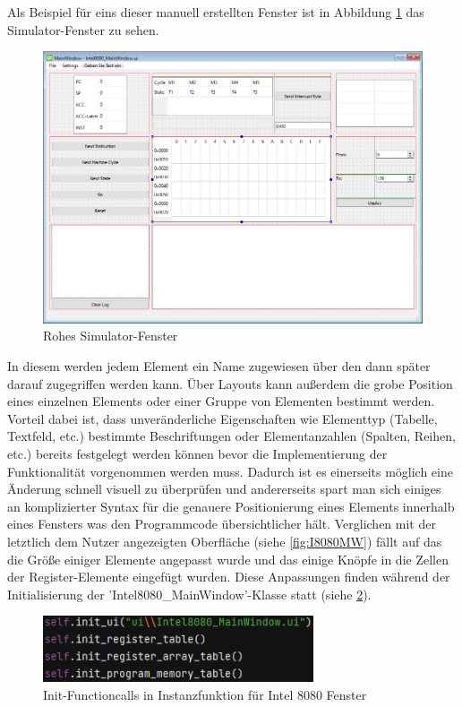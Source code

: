 \documentclass[12pt]{article}
\newcommand{\imgSpaceBefore}{\vspace{10pt}}
\begin{document}
\noindent
Als Beispiel für eins dieser manuell erstellten Fenster ist in Abbildung \ref{fig:RawUI} das Simulator-Fenster zu sehen.\imgSpaceBefore

\begin{figure}[H]
\centering
\includegraphics[width=15cm]{bilder/RawUIFile}
\caption{Rohes Simulator-Fenster}
\label{fig:RawUI}
\end{figure}

\noindent
In diesem werden jedem Element ein Name zugewiesen über den dann später darauf zugegriffen werden kann. Über Layouts kann außerdem die grobe Position eines einzelnen Elements oder einer Gruppe von Elementen bestimmt werden. Vorteil dabei ist, dass unveränderliche Eigenschaften wie Elementtyp (Tabelle, Textfeld, etc.) bestimmte Beschriftungen oder Elementanzahlen (Spalten, Reihen, etc.) bereits festgelegt werden können bevor die Implementierung der Funktionalität vorgenommen werden muss. Dadurch ist es einerseits möglich eine Änderung schnell visuell zu überprüfen und andererseits spart man sich einiges an komplizierter Syntax für die genauere Positionierung eines Elements innerhalb eines Fensters was den Programmcode übersichtlicher hält. Verglichen mit der letztlich dem Nutzer angezeigten Oberfläche (siehe \ref{fig:I8080MW}) fällt auf das die Größe einiger Elemente angepasst wurde und das einige Knöpfe in die Zellen der Register-Elemente eingefügt wurden. Diese Anpassungen finden während der Initialisierung der 'Intel8080\_MainWindow'-Klasse statt (siehe \ref{fig:InitFuncs}).\imgSpaceBefore

\begin{figure}[H]
\centering
\includegraphics[width=8cm]{bilder/initFuncs}
\caption{Init-Functioncalls in Instanzfunktion für Intel 8080 Fenster}
\label{fig:InitFuncs}
\end{figure}
\end{document}
